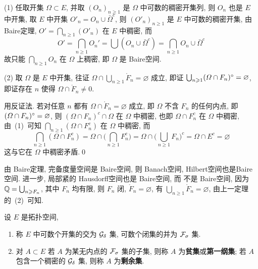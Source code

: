 	\begin{Proof}
		(1) 任取开集 $ \varOmega\subset E $, 并取 $ (O_{n})_{n\geqslant1} $ 是 $ \varOmega $ 中可数的稠密开集列, 则 $ O_{n} $ 也是 $ E $ 中开集, 取 $ E $ 中开集 $ O'_{n}=O_{n}\cup\bar{\varOmega}^{c} $, 则 $ (O'_{n})_{n\geqslant1} $ 是 $ E $ 中可数的稠密开集, 由 Baire定理, $ O'=\bigcap_{n\geqslant1}(O'_{n}) $ 在 $ E $ 中稠密, 而
		\[
			O'=\bigcap_{n\geqslant1}O_{n}'=\bigcup(O_{n}\cup\bar{\varOmega}^{c})=\bigcap_{n\geqslant1}O_{n}\cup \bar{\varOmega}^{c}
		\]
		故只能 $ \bigcap_{n\geqslant1}O_{n} $ 在 $ \varOmega $ 上稠密, 即 $ \varOmega $ 是 Baire空间.

		(2) 取 $ \varOmega $ 是 $ E $ 中开集, 往证 $ \varOmega\cap\bigcup_{n\geqslant1}\mathring F_{n}=\varnothing $ 成立, 即证 $ \bigcup_{n\geqslant1}(\varOmega\cap F_{n})^{\circ}=\varnothing $, 即证存在  $ n $ 使得 $ \varOmega\cap\mathring{F}_{n}\ne0 $.

		用反证法. 若对任意 $ n $ 都有 $ \varOmega\cap\mathring{F}_{n}=\varnothing $ 成立, 即 $ \varOmega $ 不含 $ F_{n} $ 的任何内点, 即 $ (\varOmega\cap F_{n})^{\circ}=\varnothing $, 则 $ (\varOmega\cap F_{n})^{c}\cap\varOmega $ 在 $ \varOmega $ 中稠密, 也即 $ \varOmega\cap F_{n}^{c} $ 在 $ \varOmega $ 中稠密, 由~(1)~可知 $ \bigcap_{n\geqslant1}(\varOmega\cap F_{n}^{c}) $ 在 $ \varOmega $ 中稠密, 而
		\[
			\bigcap_{n\geqslant1}(\varOmega\cap F_{n}^{c})=\varOmega\cap \Big(\bigcap_{n\geqslant1}F_{n}^{c}\Big)=\varOmega\cap\Big(\bigcup_{n\geqslant1}F_{n}\Big)^{c}=\varOmega\cap E^{c}=\varnothing
		\]
		这与它在 $ \varOmega $ 中稠密矛盾.\qed
	\end{Proof}
	\begin{Example}
		由 Baire定理, 完备度量空间是 Baire空间, 则 Banach空间, Hilbert空间也是Baire空间. 进一步, 局部紧的 Hausdorff空间也是 Baire空间, 而 \Q 不是 Baire空间, 因为 $ \mathbb{Q}=\bigcup_{n\geqslant F_{n}} $, 其中 $ F_{n} $ 均有限, 则 $ F_{n} $ 闭,  $ \mathring{F}_{n}=\varnothing $, 有 $ \bigcup_{n\geqslant1}\mathring{F}_{n}=\varnothing $, 由上一定理的~(2)~可知. 
	\end{Example}
	\begin{Definition}[纲集]\label{def:纲集}
		设 $ E $ 是拓扑空间,
		\begin{enumerate}[(1)]
			\item 称 $ E $ 中可数个开集的交为 $ \mathcal{G}_{\delta} $ 集, 可数个闭集的并为 $ \mathcal{F}_{\sigma} $ 集.
			\item 对 $ A\subset E $ 若 $ A $ 为某无内点的 $ \mathcal{F}_{\sigma} $ 集的子集, 则称 $ A $ 为\textbf{贫集}或\textbf{第一纲集}; 若 $ A $ 包含一个稠密的 $ \mathcal{G}_{\delta} $ 集, 则称 $ A $ 为\textbf{剩余集}.
			 \end{enumerate}
	\end{Definition}
